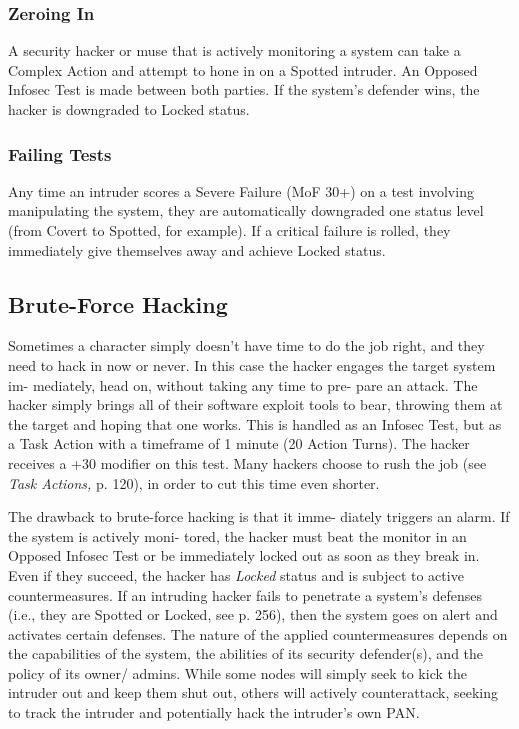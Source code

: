 \subsubsection{Zeroing In}

A security hacker or muse that is actively monitoring 
a system can take a Complex Action and attempt to 
hone in on a Spotted intruder. An Opposed Infosec Test 
is made between both parties. If the system's defender 
wins, the hacker is downgraded to Locked status.

\subsubsection{Failing Tests}

Any time an intruder scores a Severe Failure (MoF 
30+) on a test involving manipulating the system, they 
are automatically downgraded one status level (from 
Covert to Spotted, for example). If a critical failure 
is rolled, they immediately give themselves away and 
achieve Locked status.

\subsection{Brute-Force Hacking}

Sometimes a character simply doesn't have time to do 
the job right, and they need to hack in now or never. 
In this case the hacker engages the target system im-
mediately, head on, without taking any time to pre-
pare an attack. The hacker simply brings all of their 
software exploit tools to bear, throwing them at the 
target and hoping that one works. This is handled as 
an Infosec Test, but as a Task Action with a timeframe 
of 1 minute (20 Action Turns). The hacker receives 
a +30 modifier on this test. Many hackers choose to 
rush the job (see \textit{Task Actions,} p. 120), in order to cut 
this time even shorter.

The drawback to brute-force hacking is that it imme-
diately triggers an alarm. If the system is actively moni-
tored, the hacker must beat the monitor in an Opposed 
Infosec Test or be immediately locked out as soon as 
they break in. Even if they succeed, the hacker has 
\textit{Locked} status and is subject to active countermeasures.
If an intruding hacker fails to penetrate a system's 
defenses (i.e., they are Spotted or Locked, see p. 256), 
then the system goes on alert and activates certain 
defenses. The nature of the applied countermeasures 
depends on the capabilities of the system, the abilities 
of its security defender(s), and the policy of its owner/
admins. While some nodes will simply seek to kick 
the intruder out and keep them shut out, others will 
actively counterattack, seeking to track the intruder 
and potentially hack the intruder's own PAN.

